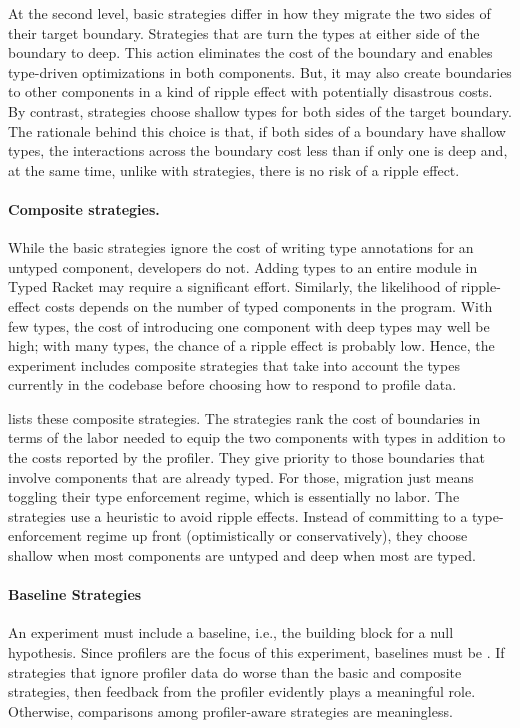 

At the second level, basic strategies differ in how they migrate the two sides
 of their target boundary. Strategies that are \optkw{} turn the types at either
 side of the boundary to deep.
 This action eliminates the cost of the boundary and enables type-driven
 optimizations in both components.
 But, it may also create boundaries to other components in a kind of ripple
 effect with potentially disastrous costs.
 By contrast, \conkw{} strategies choose shallow types for both
 sides of the target boundary.
 The rationale behind this choice is that, if both sides of a
 boundary have shallow types, the interactions across the boundary cost less
 than if only one is deep and, at the same time, unlike with \optkw{}
 strategies, there is no risk of a ripple effect.



\paragraph{Composite strategies.} While the basic strategies ignore the cost of
 writing type annotations for an untyped component, developers do not.
 Adding types to an entire module in Typed Racket may require a significant
 effort.
 Similarly, the likelihood of ripple-effect costs depends on the number
 of typed components in the program.
 With few types, the cost of introducing one component with deep types may well be high;
 with many types, the chance of a ripple effect is probably low.
 Hence, the experiment includes composite strategies that take into account the
 types currently in the codebase before choosing how to respond to profile data.

 lists these composite strategies.
 The \costkw{} strategies rank the cost of boundaries in terms of the labor needed to equip the two components
 with types in addition to the costs reported by the profiler.
 They give priority to those boundaries that involve components
 that are already typed.  For those, migration just means toggling their type
 enforcement regime, which is essentially no labor.
 The \confkw{} strategies use a heuristic to avoid ripple effects.
 Instead of committing to a type-enforcement regime up front
 (optimistically or conservatively), they choose shallow when most components
 are untyped and deep when most are typed.

\paragraph{Baseline Strategies} An experiment must include a baseline, i.e., the
 building block for a null hypothesis.
 Since profilers are the focus of this experiment, baselines must be
 \agnostickw{}.
 If strategies that ignore profiler data do worse than the basic and composite
 strategies, then feedback from the profiler evidently plays a meaningful role.
 Otherwise, comparisons among profiler-aware strategies are meaningless.


